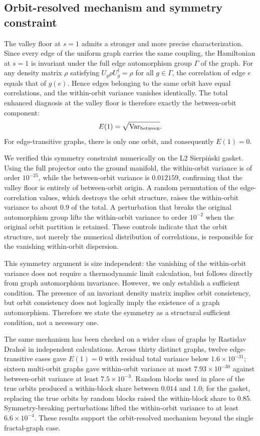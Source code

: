 \documentclass[aps,prb,reprint,superscriptaddress]{revtex4-2}
\begin{document}
\subsection{Orbit-resolved mechanism and symmetry constraint}
\label{sec:orbit_mechanism}

The valley floor at $s=1$ admits a stronger and more precise characterization. Since every edge of the uniform graph carries the same coupling, the Hamiltonian at $s=1$ is invariant under the full edge automorphism group $\Gamma$ of the graph. For any density matrix $\rho$ satisfying $U_g\rho U_g^\dagger=\rho$ for all $g\in\Gamma$, the correlation of edge $e$ equals that of $g(e)$. Hence edges belonging to the same orbit have equal correlations, and the within-orbit variance vanishes identically. The total enhanced diagnosis at the valley floor is therefore exactly the between-orbit component:
\begin{equation}
E(1)=\sqrt{\mathrm{Var}_{\rm between}}.
\end{equation}
For edge-transitive graphs, there is only one orbit, and consequently $E(1)=0$.

We verified this symmetry constraint numerically on the L2 Sierpi\'{n}ski gasket. Using the full projector onto the ground manifold, the within-orbit variance is of order $10^{-25}$, while the between-orbit variance is $0.012159$, confirming that the valley floor is entirely of between-orbit origin. A random permutation of the edge-correlation values, which destroys the orbit structure, raises the within-orbit variance to about $0.9$ of the total. A perturbation that breaks the original automorphism group lifts the within-orbit variance to order $10^{-2}$ when the original orbit partition is retained. These controls indicate that the orbit structure, not merely the numerical distribution of correlations, is responsible for the vanishing within-orbit dispersion.

This symmetry argument is size independent: the vanishing of the within-orbit variance does not require a thermodynamic limit calculation, but follows directly from graph automorphism invariance. However, we only establish a sufficient condition. The presence of an invariant density matrix implies orbit consistency, but orbit consistency does not logically imply the existence of a graph automorphism. Therefore we state the symmetry as a structural sufficient condition, not a necessary one.

The same mechanism has been checked on a wider class of graphs by Rastislav Draho\v{s} in independent calculations. Across thirty distinct graphs, twelve edge-transitive cases gave $E(1)=0$ with residual total variance below $1.6\times10^{-31}$; sixteen multi-orbit graphs gave within-orbit variance at most $7.93\times10^{-30}$ against between-orbit variance at least $7.5\times10^{-3}$. Random blocks used in place of the true orbits produced a within-block share between $0.014$ and $1.0$; for the gasket, replacing the true orbits by random blocks raised the within-block share to $0.85$. Symmetry-breaking perturbations lifted the within-orbit variance to at least $6.6\times10^{-4}$. These results support the orbit-resolved mechanism beyond the single fractal-graph case.
\end{document}
